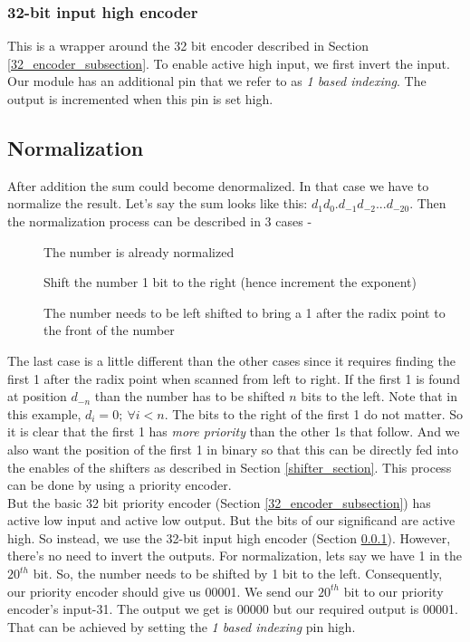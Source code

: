 \documentclass[14pt]{article}
\begin{document}
\subsubsection{32-bit input high encoder}\label{32_high_encoder_subsection}
This is a wrapper around the 32 bit encoder described in Section \ref{32_encoder_subsection}. To enable active high input, we first invert the input.  Our module has an additional pin that we refer to as \textit{1 based indexing}. The output is incremented when this pin is set high. 

\subsection{Normalization}\label{normalizer_section}
After addition the sum could become denormalized. In that case we have to normalize the result. Let's say the sum looks like this:  $d_1d_0.d_{-1}d_{-2}...d_{-20}$. Then the normalization process can be described in 3 cases -
\begin{description}
	\item[] The number is already normalized
	\item[] Shift the number 1 bit to the right (hence increment the exponent)
	\item[] The number needs to be left shifted to bring a 1 after the radix point to the front of the number
\end{description}

The last case is a little different than the other cases since it requires finding the first 1 after the radix point when scanned from left to right. If the first 1 is found at position $d_{-n}$ than the number has to be shifted $n$ bits to the left. Note that in this example, $d_i = 0;\ \forall i < n$. The bits to the right of the first 1 do not matter. So it is clear that the first 1 has \textit{more priority} than the other 1s that follow. And we also want the position of the first 1 in binary so that this can be directly fed into the enables of the shifters as described in Section \ref{shifter_section}. This process can be done by using a priority encoder.\\

But the basic 32 bit priority encoder (Section \ref{32_encoder_subsection}) has active low input and active low output. But the bits of our significand are active high. So instead, we use the 32-bit input high encoder (Section \ref{32_high_encoder_subsection}). However, there's no need to invert the outputs. For normalization, lets say we have 1 in the $20^{th}$ bit.  So, the number needs to be shifted by 1 bit to the left. Consequently, our priority encoder should give us 00001. We send our $20^{th}$ bit to our priority encoder's input-31. The output we get is 00000 but our required output is 00001. That can be achieved by setting the \textit{1 based indexing} pin high.\\
\end{document}
